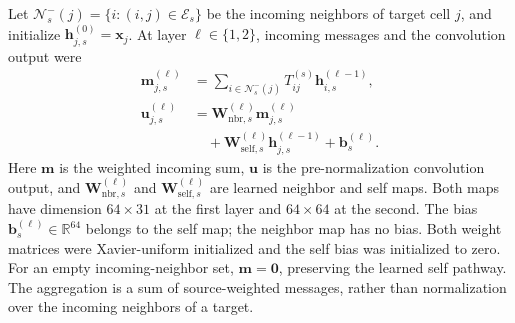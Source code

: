 Let \(\mathcal N_s^-(j)=\{i:(i,j)\in\mathcal E_s\}\) be the incoming neighbors of target cell \(j\), and initialize \(\boldsymbol h_{j,s}^{(0)}=\boldsymbol x_j\). At layer \(\ell\in\{1,2\}\), incoming messages and the convolution output were
\begin{equation}\label{eq:convolution}
\begin{aligned}
\boldsymbol m_{j,s}^{(\ell)}
&=\sum_{i\in\mathcal N_s^-(j)}T_{ij}^{(s)}\boldsymbol h_{i,s}^{(\ell-1)},\\
\boldsymbol u_{j,s}^{(\ell)}
&=\mathbf W_{\mathrm{nbr},s}^{(\ell)}\boldsymbol m_{j,s}^{(\ell)}\\
&\quad+\mathbf W_{\mathrm{self},s}^{(\ell)}\boldsymbol h_{j,s}^{(\ell-1)}
+\boldsymbol b_s^{(\ell)}.
\end{aligned}
\end{equation}
Here \(\boldsymbol m\) is the weighted incoming sum, \(\boldsymbol u\) is the pre-normalization convolution output, and \(\mathbf W_{\mathrm{nbr},s}^{(\ell)}\) and \(\mathbf W_{\mathrm{self},s}^{(\ell)}\) are learned neighbor and self maps. Both maps have dimension \(64\times31\) at the first layer and \(64\times64\) at the second. The bias \(\boldsymbol b_s^{(\ell)}\in\mathbb R^{64}\) belongs to the self map; the neighbor map has no bias. Both weight matrices were Xavier-uniform initialized and the self bias was initialized to zero. For an empty incoming-neighbor set, \(\boldsymbol m=\boldsymbol0\), preserving the learned self pathway. The aggregation is a sum of source-weighted messages, rather than normalization over the incoming neighbors of a target.

